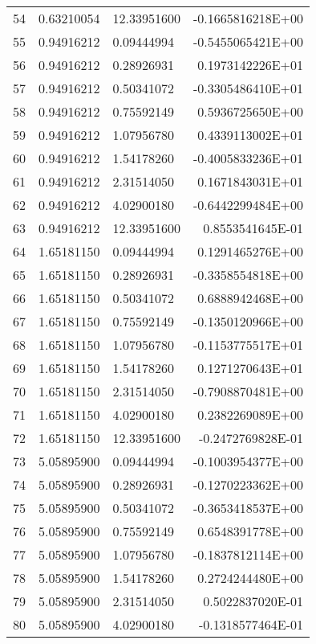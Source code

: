 \begin{longtable}{@{\extracolsep{\fill}}cllr@{}}
54  &  0.63210054  &  12.33951600  &  -0.1665816218E+00 \\
55  &  0.94916212  &  0.09444994  &  -0.5455065421E+00 \\
56  &  0.94916212  &  0.28926931  &   0.1973142226E+01 \\
57  &  0.94916212  &  0.50341072  &  -0.3305486410E+01 \\
58  &  0.94916212  &  0.75592149  &   0.5936725650E+00 \\
59  &  0.94916212  &  1.07956780  &   0.4339113002E+01 \\
60  &  0.94916212  &  1.54178260  &  -0.4005833236E+01 \\
61  &  0.94916212  &  2.31514050  &   0.1671843031E+01 \\
62  &  0.94916212  &  4.02900180  &  -0.6442299484E+00 \\
63  &  0.94916212  &  12.33951600  &   0.8553541645E-01 \\
64  &  1.65181150  &  0.09444994  &   0.1291465276E+00 \\
65  &  1.65181150  &  0.28926931  &  -0.3358554818E+00 \\
66  &  1.65181150  &  0.50341072  &   0.6888942468E+00 \\
67  &  1.65181150  &  0.75592149  &  -0.1350120966E+00 \\
68  &  1.65181150  &  1.07956780  &  -0.1153775517E+01 \\
69  &  1.65181150  &  1.54178260  &   0.1271270643E+01 \\
70  &  1.65181150  &  2.31514050  &  -0.7908870481E+00 \\
71  &  1.65181150  &  4.02900180  &   0.2382269089E+00 \\
72  &  1.65181150  &  12.33951600  &  -0.2472769828E-01 \\
73  &  5.05895900  &  0.09444994  &  -0.1003954377E+00 \\
74  &  5.05895900  &  0.28926931  &  -0.1270223362E+00 \\
75  &  5.05895900  &  0.50341072  &  -0.3653418537E+00 \\
76  &  5.05895900  &  0.75592149  &   0.6548391778E+00 \\
77  &  5.05895900  &  1.07956780  &  -0.1837812114E+00 \\
78  &  5.05895900  &  1.54178260  &   0.2724244480E+00 \\
79  &  5.05895900  &  2.31514050  &   0.5022837020E-01 \\
80  &  5.05895900  &  4.02900180  &  -0.1318577464E-01 \\

\end{longtable}
